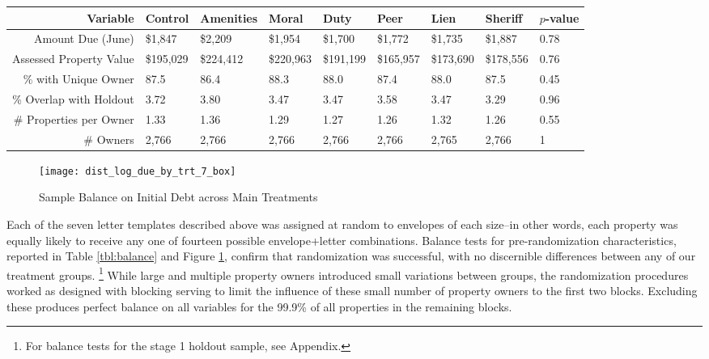 \documentclass[12pt,titlepage]{article}
\begin{document}
\begin{sidewaystable}[htbp]
\centering
\begin{tabular}{|r|lllllll|l|}
  \hline
Variable & Control & Amenities & Moral & Duty & Peer & Lien & Sheriff & $p$-value \\ 
   \hline
Amount Due (June) & \$1,847 & \$2,209 & \$1,954 & \$1,700 & \$1,772 & \$1,735 & \$1,887 & 0.78 \\ 
  Assessed Property Value & \$195,029 & \$224,412 & \$220,963 & \$191,199 & \$165,957 & \$173,690 & \$178,556 & 0.76 \\ 
  \% with Unique Owner & 87.5 & 86.4 & 88.3 & 88.0 & 87.4 & 88.0 & 87.5 & 0.45 \\ 
  \% Overlap with Holdout & 3.72 & 3.80 & 3.47 & 3.47 & 3.58 & 3.47 & 3.29 & 0.96 \\ 
  \# Properties per Owner & 1.33 & 1.36 & 1.29 & 1.27 & 1.26 & 1.32 & 1.26 & 0.55 \\ 
  \# Owners & 2,766 & 2,766 & 2,766 & 2,766 & 2,766 & 2,765 & 2,766 & 1 \\ 
   \hline
\end{tabular}
\caption{Balance on Observables} 
\label{tbl:balance}
\end{sidewaystable}

\begin{figure}[htpb]
\begin{center}
\caption{Sample Balance on Initial Debt across Main Treatments}
\label{fig:box_bal}
\bigskip
\texttt{[image: dist\_log\_due\_by\_trt\_7\_box]}
\end{center}
\end{figure}

Each of the seven letter templates described above was assigned at random 
to envelopes of each size--in other words, each property was equally 
likely to receive any one of fourteen possible envelope+letter combinations. 
Balance tests for pre-randomization characteristics, 
reported in Table \ref{tbl:balance} and Figure \ref{fig:box_bal}, 
confirm that randomization was successful, 
with no discernible differences between any of our treatment groups.
\footnote{For balance tests for the stage 1 holdout sample, see Appendix.}
While large and multiple property owners introduced small variations 
between groups, the randomization procedures worked as designed with 
blocking serving to limit the influence of these small number of property 
owners to the first two blocks. Excluding these produces perfect balance 
on all variables for the 99.9\% of all properties in the remaining blocks.
\end{document}
